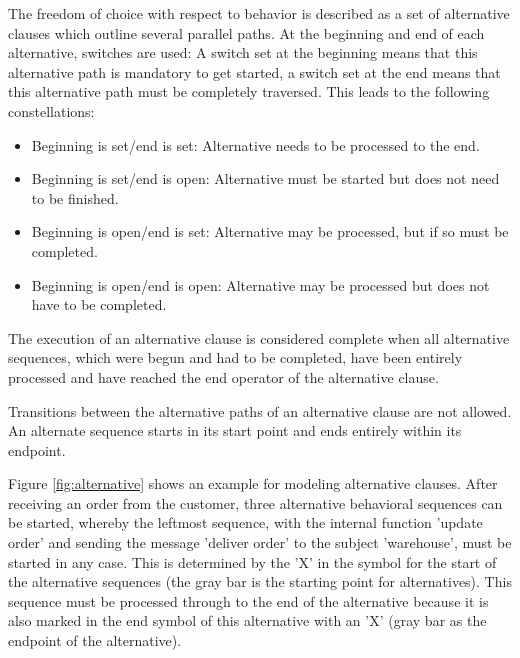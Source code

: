 The freedom of choice with respect to behavior is described as a set of alternative clauses which outline several parallel paths. At the beginning and end of each alternative, switches are used: A switch set at the beginning means that this alternative path is mandatory to get started, a switch set at the end means that this alternative path must be completely traversed. This leads to the following constellations:

\begin{itemize}
	\item Beginning is set/end is set: Alternative needs to be processed to the end.
	\item Beginning is set/end is open: Alternative must be started but does not need to be finished. 
	\item Beginning is open/end is set: Alternative may be processed, but if so must be completed.
	\item Beginning is open/end is open: Alternative may be processed but does not have to be completed.
\end{itemize}

The execution of an alternative clause is considered complete when all alternative sequences, which were begun and had to be completed, have been entirely processed and have reached the end operator of the alternative clause.

Transitions between the alternative paths of an alternative clause are not allowed. An alternate sequence starts in its start point and ends entirely within its endpoint.

Figure \ref{fig:alternative} shows an example for modeling alternative clauses. After receiving an order from the customer, three alternative behavioral sequences can be started, whereby the leftmost sequence, with the internal function 'update order' and sending the message 'deliver order' to the subject 'warehouse', must be started in any case. This is determined by the 'X' in the symbol for the start of the alternative sequences (the gray bar is the starting point for alternatives). This sequence must be processed through to the end of the alternative because it is also marked in the end symbol of this alternative with an 'X' (gray bar as the endpoint of the alternative).

